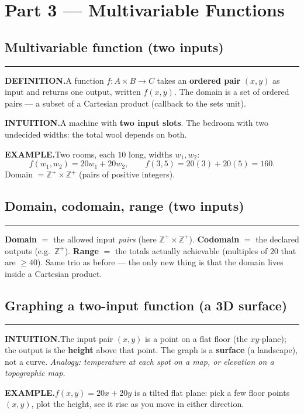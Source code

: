 \documentclass[12pt]{article}
\begin{document}
\newpage
\section*{Part 3 --- Multivariable Functions}

\subsection*{Multivariable function (two inputs)}
\hrule
\textbf{DEFINITION.}\quad A function $f\colon A \times B \to C$ takes an \textbf{ordered pair} $(x,y)$ as input and returns one output, written $f(x,y)$. The domain is a set of ordered pairs --- a subset of a Cartesian product (callback to the sets unit).

\textbf{INTUITION.}\quad A machine with \textbf{two input slots}. The bedroom with two undecided widths: the total wool depends on both.

\textbf{EXAMPLE.}\quad Two rooms, each $10$ long, widths $w_1, w_2$:
\[
  f(w_1, w_2) = 20w_1 + 20w_2, \qquad f(3,5) = 20(3) + 20(5) = 160.
\]
Domain $= \mathbb{Z}^+ \times \mathbb{Z}^+$ (pairs of positive integers).

\subsection*{Domain, codomain, range (two inputs)}
\hrule
\textbf{Domain} $=$ the allowed input \emph{pairs} (here $\mathbb{Z}^+ \times \mathbb{Z}^+$).\quad
\textbf{Codomain} $=$ the declared outputs (e.g.\ $\mathbb{Z}^+$).\quad
\textbf{Range} $=$ the totals actually achievable (multiples of $20$ that are $\ge 40$). Same trio as before --- the only new thing is that the domain lives inside a Cartesian product.

\subsection*{Graphing a two-input function (a 3D surface)}
\hrule
\textbf{INTUITION.}\quad The input pair $(x,y)$ is a point on a flat floor (the $xy$-plane); the output is the \textbf{height} above that point. The graph is a \textbf{surface} (a landscape), not a curve. \textit{Analogy: temperature at each spot on a map, or elevation on a topographic map.}

\textbf{EXAMPLE.}\quad $f(x,y) = 20x + 20y$ is a tilted flat plane: pick a few floor points $(x,y)$, plot the height, see it rise as you move in either direction.
\end{document}
